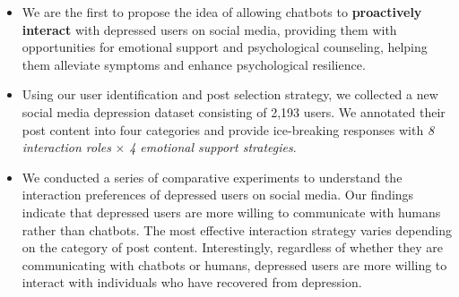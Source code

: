\begin{itemize}
    \item We are the first to propose the idea of allowing chatbots to \textbf{proactively interact} with depressed users on social media, providing them with opportunities for emotional support and psychological counseling, helping them alleviate symptoms and enhance psychological resilience.
    \item Using our user identification and post selection strategy, we collected a new social media depression dataset consisting of 2,193 users. We annotated their post content into four categories and provide ice-breaking responses with \textit{8 interaction roles} $\times$ \textit{4 emotional support strategies}.
     \item We conducted a series of comparative experiments to understand the interaction preferences of depressed users on social media. Our findings indicate that depressed users are more willing to communicate with humans rather than chatbots. The most effective interaction strategy varies depending on the category of post content. Interestingly, regardless of whether they are communicating with chatbots or humans, depressed users are more willing to interact with individuals who have recovered from depression. %
\end{itemize}